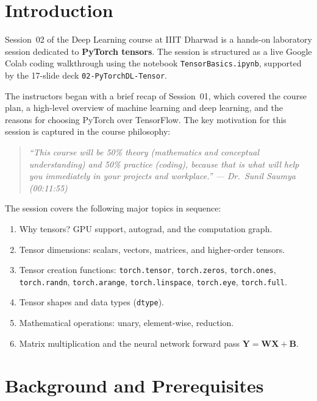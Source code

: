 \documentclass[12pt,a4paper]{article}
\newcommand{\tbf}[1]{\textbf{#1}}
\newcommand{\ttt}[1]{\texttt{#1}}
\begin{document}
\section{Introduction}
\label{sec:intro}

Session~02 of the Deep Learning course at IIIT Dharwad is a hands-on
laboratory session dedicated to \tbf{PyTorch tensors}. The session is
structured as a live Google Colab coding walkthrough using the notebook
\ttt{TensorBasics.ipynb}, supported by the 17-slide deck
\ttt{02-PyTorchDL-Tensor}.

The instructors began with a brief recap of Session~01, which covered the
course plan, a high-level overview of machine learning and deep learning, and
the reasons for choosing PyTorch over TensorFlow. The key motivation for this
session is captured in the course philosophy:

\begin{quote}
  \itshape ``This course will be 50\% theory (mathematics and conceptual
  understanding) and 50\% practice (coding), because that is what will help you
  immediately in your projects and workplace.''
  \upshape \quad --- Dr.\ Sunil Saumya (00:11:55)
\end{quote}

The session covers the following major topics in sequence:
\begin{enumerate}[label=\arabic*.]
  \item Why tensors? GPU support, autograd, and the computation graph.
  \item Tensor dimensions: scalars, vectors, matrices, and higher-order tensors.
  \item Tensor creation functions: \ttt{torch.tensor}, \ttt{torch.zeros},
        \ttt{torch.ones}, \ttt{torch.randn}, \ttt{torch.arange},
        \ttt{torch.linspace}, \ttt{torch.eye}, \ttt{torch.full}.
  \item Tensor shapes and data types (\ttt{dtype}).
  \item Mathematical operations: unary, element-wise, reduction.
  \item Matrix multiplication and the neural network forward pass
        $\mathbf{Y} = \mathbf{W}\mathbf{X} + \mathbf{B}$.
\end{enumerate}

\section{Background and Prerequisites}
\label{sec:background}
\end{document}
